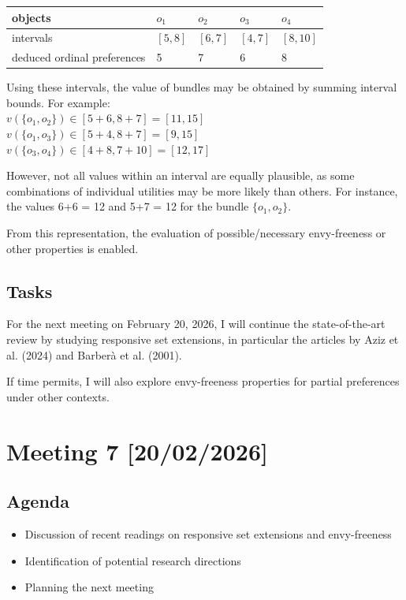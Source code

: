 \documentclass{article}
\begin{document}
\begin{tabular}{ |p{5cm}|p{2cm}|p{2cm}|p{2cm}|p{2cm}|  }
    \hline
    objects & $o_1$ & $o_2$ & $o_3$ & $o_4$ \\
    \hline
    intervals & $[5,8]$ & $[6,7]$ & $[4,7]$ & $[8, 10]$ \\
    \hline
    deduced ordinal preferences & 5 & 7 & 6 & 8 \\
     \hline
\end{tabular}

Using these intervals, the value of bundles may be obtained by summing interval bounds. For example:
\\ $v(\{o_1, o_2\}) \in [5+6, 8+7] = [11, 15]$
\\ $v(\{o_1, o_3\}) \in [5+4, 8+7] = [9, 15] $
\\ $v(\{o_3, o_4\}) \in [4+8, 7+10] = [12, 17] $

However, not all values within an interval are equally plausible, as some combinations of individual utilities may be more likely than others. For instance, the values 6+6 = 12 and 5+7 = 12 for the bundle $\{o_1, o_2\}$.

From this representation, the evaluation of possible/necessary envy-freeness or other properties is enabled.


\subsection{Tasks}
For the next meeting on February 20, 2026, I will continue the state-of-the-art review by studying responsive set extensions, in particular the articles by Aziz et al. (2024) and Barberà et al. (2001).

If time permits, I will also explore envy-freeness properties for partial preferences under other contexts.
\newpage

\section{Meeting 7 [20/02/2026]}

\subsection{Agenda}
\begin{itemize}
    \item Discussion of recent readings on responsive set extensions and envy-freeness
    \item Identification of potential research directions
    \item Planning the next meeting
\end{itemize}
\end{document}
